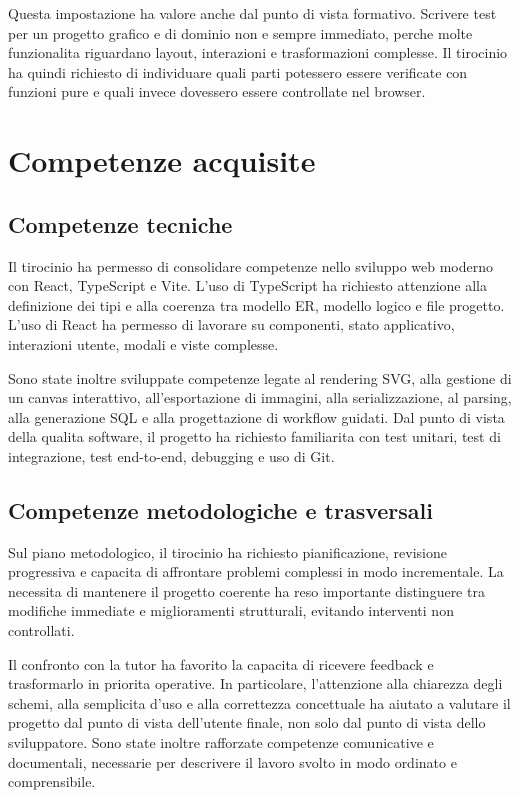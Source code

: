 Questa impostazione ha valore anche dal punto di vista formativo. Scrivere test per un progetto grafico e di dominio non e sempre immediato, perche molte funzionalita riguardano layout, interazioni e trasformazioni complesse. Il tirocinio ha quindi richiesto di individuare quali parti potessero essere verificate con funzioni pure e quali invece dovessero essere controllate nel browser.

\section{Competenze acquisite}

\subsection{Competenze tecniche}

Il tirocinio ha permesso di consolidare competenze nello sviluppo web moderno con React, TypeScript e Vite. L'uso di TypeScript ha richiesto attenzione alla definizione dei tipi e alla coerenza tra modello ER, modello logico e file progetto. L'uso di React ha permesso di lavorare su componenti, stato applicativo, interazioni utente, modali e viste complesse.

Sono state inoltre sviluppate competenze legate al rendering SVG, alla gestione di un canvas interattivo, all'esportazione di immagini, alla serializzazione, al parsing, alla generazione SQL e alla progettazione di workflow guidati. Dal punto di vista della qualita software, il progetto ha richiesto familiarita con test unitari, test di integrazione, test end-to-end, debugging e uso di Git.

\subsection{Competenze metodologiche e trasversali}

Sul piano metodologico, il tirocinio ha richiesto pianificazione, revisione progressiva e capacita di affrontare problemi complessi in modo incrementale. La necessita di mantenere il progetto coerente ha reso importante distinguere tra modifiche immediate e miglioramenti strutturali, evitando interventi non controllati.

Il confronto con la tutor ha favorito la capacita di ricevere feedback e trasformarlo in priorita operative. In particolare, l'attenzione alla chiarezza degli schemi, alla semplicita d'uso e alla correttezza concettuale ha aiutato a valutare il progetto dal punto di vista dell'utente finale, non solo dal punto di vista dello sviluppatore. Sono state inoltre rafforzate competenze comunicative e documentali, necessarie per descrivere il lavoro svolto in modo ordinato e comprensibile.

